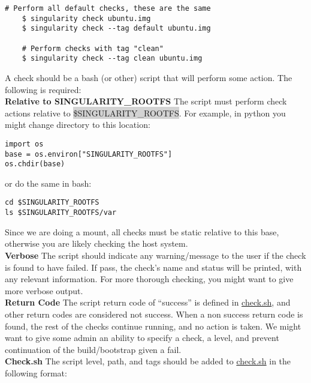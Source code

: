 \documentclass[a4paper]{article}
\newcounter{subsubsubsection}[subsubsection]
\begin{document}
\begin{lstlisting}[frame=single]
    # Perform all default checks, these are the same
    $ singularity check ubuntu.img
    $ singularity check --tag default ubuntu.img

    # Perform checks with tag "clean"
    $ singularity check --tag clean ubuntu.img

\end{lstlisting}



A check should be a bash (or other) script that will perform some action. The following is required:\\[0.1in]

\textbf{Relative to SINGULARITY\_ROOTFS} The script must perform check actions relative to \colorbox{lightgray}{\$SINGULARITY\_ROOTFS}. For example, in python you might change directory to this location:
\begin{lstlisting}[frame=single]
import os
base = os.environ["SINGULARITY_ROOTFS"]
os.chdir(base)
\end{lstlisting}


or do the same in bash:

\begin{lstlisting}[frame=single]
cd $SINGULARITY_ROOTFS
ls $SINGULARITY_ROOTFS/var
\end{lstlisting}

Since we are doing a mount, all checks must be static relative to this base, otherwise you are likely checking the host system.\\[0.1in]

\textbf{Verbose} The script should indicate any warning/message to the user if the check is found to have failed. If pass, the check’s name and status will be printed, with any relevant information. For more thorough checking, you might want to give more verbose output.\\[0.1in]

\textbf{Return Code} The script return code of “success” is defined in \href{http://singularity.lbl.gov/check.sh}{check.sh}, and other return codes are considered not success. When a non success return code is found, the rest of the checks continue running, and no action is taken. We might want to give some admin an ability to specify a check, a level, and prevent continuation of the build/bootstrap given a fail.\\[0.1in]

\textbf{Check.sh} The script level, path, and tags should be added to \href{http://singularity.lbl.gov/check.sh}{check.sh} in the following format:
\end{document}
